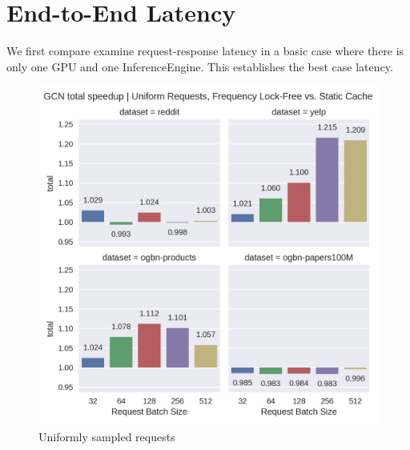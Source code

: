 \section{End-to-End Latency}
We first compare examine request-response latency in a basic case where there is only one GPU and one InferenceEngine. This establishes the best case latency.
\begin{figure}[h!]
    \begin{minipage}[c]{0.499\textwidth}
        \centering
        \includegraphics[width=\textwidth]{figures/speedup_GCN_total_uniform.png}
        \caption*{Uniformly sampled requests}
    \end{minipage}
    \hfill
    \begin{minipage}[c]{0.499\textwidth}
        \centering

\end{minipage}
\end{figure}
